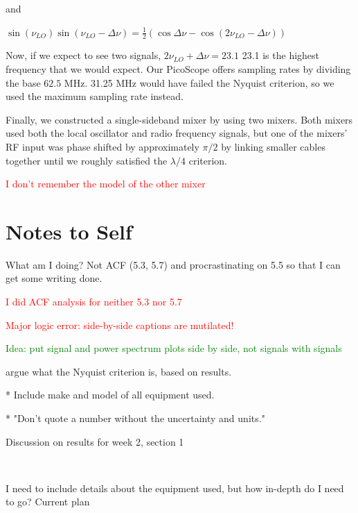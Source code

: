 \documentclass[a4paper]{article}
\begin{document}
and

$\sin(\nu_{LO}) \sin(\nu_{LO} - \Delta \nu) = \frac{1}{2} (\cos \Delta \nu - \cos (2\nu_{LO} - \Delta \nu))$

Now, if we expect to see two signals, $2\nu_{LO} + \Delta \nu = 23.1$ 23.1 is the highest frequency that we would expect. Our PicoScope offers sampling rates by dividing the base $62.5$ MHz. 31.25 MHz would have failed the Nyquist criterion, so we used the maximum sampling rate instead. 

Finally, we constructed a single-sideband mixer by using two mixers. Both mixers used both the local oscillator and radio frequency signals, but one of the mixers' RF input was phase shifted by approximately $\pi / 2$ by linking smaller cables together until we roughly satisfied the $\lambda / 4$ criterion.

\textcolor{red}{I don't remember the model of the other mixer} 

\section{Notes to Self}


What am I doing? Not ACF (5.3, 5.7) and procrastinating on 5.5 so that I can get some writing done.

\textcolor{red}{I did ACF analysis for neither 5.3 nor 5.7}

\textcolor{red}{Major logic error: side-by-side captions are mutilated!}

\textcolor{green}{Idea: put signal and power spectrum plots side by side, not signals with signals}



argue what the Nyquist criterion is, based on results.

* Include make and model of all equipment used.

* "Don't quote a number without the uncertainty and units."


Discussion on results for week 2, section 1

\

I need to include details about the equipment used, but how in-depth do I need to go? Current plan
\end{document}
